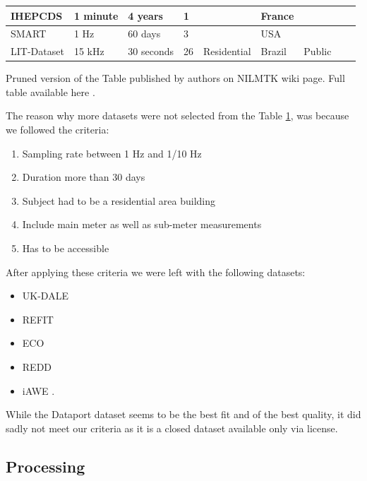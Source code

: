 \begin{table}[H]
{\begin{tabular}{|l|l|l|l|l|l|l|l|l|}
        IHEPCDS & 1 minute & 4 years & 1 & ~ & France & ~ \\ \hline
        SMART & 1 Hz & 60 days & 3 & ~ & USA & ~ \\ \hline
        LIT-Dataset & 15 kHz & 30 seconds & 26 & Residential & Brazil & Public \\ \hline
    \end{tabular}}
    \par 
    \par\footnotesize{Pruned version of the Table published by authors on NILMTK wiki page. Full table available here .}
    \label{tab:other_datasets}
\end{table}



The reason why more datasets were not selected from the Table \ref{tab:other_datasets},
was because we followed the criteria:
\begin{enumerate}
    \item Sampling rate between 1 Hz and 1/10 Hz
    \item Duration more than 30 days
    \item Subject had to be a residential area building
    \item Include main meter as well as sub-meter measurements
    \item Has to be accessible
\end{enumerate}

After applying these criteria we were left with the following datasets:

\begin{itemize}
    \item UK-DALE \cite{UKDALE}
    \item REFIT \cite{REFIT}
    \item ECO \cite{ECO}
    \item REDD \cite{REDD}
    \item iAWE \cite{iAWE}.
\end{itemize}

While the Dataport dataset seems to be the best fit and of the best quality, it did sadly not meet our criteria as it is a closed dataset available only via license.

\subsection{Processing}

